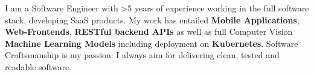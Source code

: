 \documentclass[8pt]{developercv} %
\begin{document}
\vspace{0.5cm}



\begin{minipage}[t]{0.4\textwidth} %
	\vspace{-\baselineskip} %
	
	I am a Software Engineer with >5 years of experience working in the full software stack, developing SaaS products.
	My work has entailed \textbf{Mobile Applications}, \textbf{Web-Frontends}, \textbf{RESTful backend APIs} as well as full Computer Vision \textbf{Machine Learning Models} including deployment on \textbf{Kubernetes}.
	Software Craftsmanship is my passion: I always aim for delivering clean, tested and readable software.
\end{minipage}
\hfill %
\begin{minipage}[t]{0.5\textwidth} %
	\vspace{-\baselineskip} %
	\begin{barchart}{5.5}
	\end{barchart}
\end{minipage}



\end{document}
